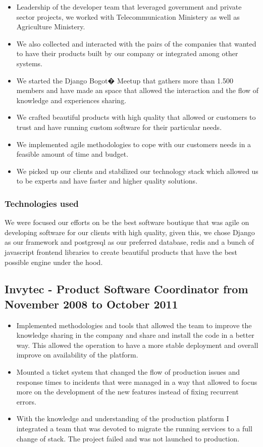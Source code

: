 \documentclass{article}
\begin{document}
\begin{itemize}
\item Leadership of the developer team that leveraged government and private sector projects, we worked with Telecommunication Ministery as well as Agriculture Ministery.
\item We also collected and interacted with the pairs of the companies that wanted to have their products built by our company or integrated among other systems.
\item We started the Django Bogot� Meetup that gathers more than 1.500 members and have made an space that allowed the interaction and the flow of knowledge and experiences sharing.
\item We crafted beautiful products with high quality that allowed or customers to trust and have running custom software for their particular needs.
\item We implemented agile methodologies to cope with our customers needs in a feasible amount of time and budget.
\item We picked up our clients and stabilized our technology stack which allowed us to be experts and have faster and higher quality solutions.

\end{itemize}

\subsubsection{Technologies used}
\label{sec:axiacoretech}

We were focused our efforts on be the best software boutique that was agile on developing software for our clients with high quality, given this, we chose Django as our framework and postgresql as our preferred database, redis and a bunch of javascript frontend libraries to create beautiful products that have the best possible engine under the hood.

\subsection{Invytec - Product Software Coordinator from November 2008 to October 2011}
\label{sec:invytec}

\begin{itemize}
\item Implemented methodologies and tools that allowed the team to improve the knowledge sharing in the company and share and install the code in a better way.  This allowed the operation to have a more stable deployment and overall improve on availability of the platform.
\item Mounted a ticket system that changed the flow of production issues and response times to incidents that were managed in a way that allowed to focus more on the development of the new features instead of fixing recurrent errors.
\item With the knowledge and understanding of the production platform I integrated a team that was devoted to migrate the running services to a full change of stack.  The project failed and was not launched to production.
\end{itemize}
\end{document}
